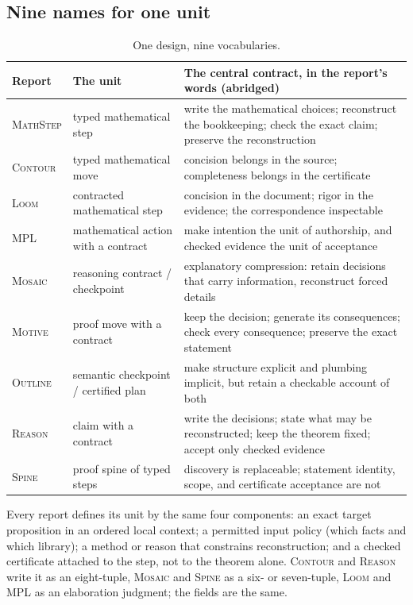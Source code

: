 \documentclass[11pt,a4paper]{article}
\newcommand{\MS}{\textsc{MathStep}}
\newcommand{\Co}{\textsc{Contour}}
\newcommand{\Lo}{\textsc{Loom}}
\newcommand{\ML}{\textsc{MPL}}
\newcommand{\Mo}{\textsc{Mosaic}}
\newcommand{\Mv}{\textsc{Motive}}
\newcommand{\Ou}{\textsc{Outline}}
\renewcommand{\Re}{\textsc{Reason}} %
\newcommand{\Sp}{\textsc{Spine}}
\theoremstyle{definition}
\begin{document}
\subsection{Nine names for one unit}
\begin{table}[htbp]
\centering\small
\begin{tabularx}{\textwidth}{@{}L{.11\textwidth}L{.27\textwidth}Y@{}}
\toprule
Report & The unit & The central contract, in the report's words (abridged)\\
\midrule
\MS & typed mathematical step & write the mathematical choices; reconstruct the bookkeeping; check the exact claim; preserve the reconstruction\\
\Co & typed mathematical move & concision belongs in the source; completeness belongs in the certificate\\
\Lo & contracted mathematical step & concision in the document; rigor in the evidence; the correspondence inspectable\\
\ML & mathematical action with a contract & make intention the unit of authorship, and checked evidence the unit of acceptance\\
\Mo & reasoning contract / checkpoint & explanatory compression: retain decisions that carry information, reconstruct forced details\\
\Mv & proof move with a contract & keep the decision; generate its consequences; check every consequence; preserve the exact statement\\
\Ou & semantic checkpoint / certified plan & make structure explicit and plumbing implicit, but retain a checkable account of both\\
\Re & claim with a contract & write the decisions; state what may be reconstructed; keep the theorem fixed; accept only checked evidence\\
\Sp & proof spine of typed steps & discovery is replaceable; statement identity, scope, and certificate acceptance are not\\
\bottomrule
\end{tabularx}
\caption{One design, nine vocabularies.}
\label{tab:names}
\end{table}

Every report defines its unit by the same four components: an exact target proposition in an ordered local context; a permitted input policy (which facts and which library); a method or reason that constrains reconstruction; and a checked certificate attached to the step, not to the theorem alone. \Co{} and \Re{} write it as an eight-tuple, \Mo{} and \Sp{} as a six- or seven-tuple, \Lo{} and \ML{} as an elaboration judgment; the fields are the same.
\end{document}

